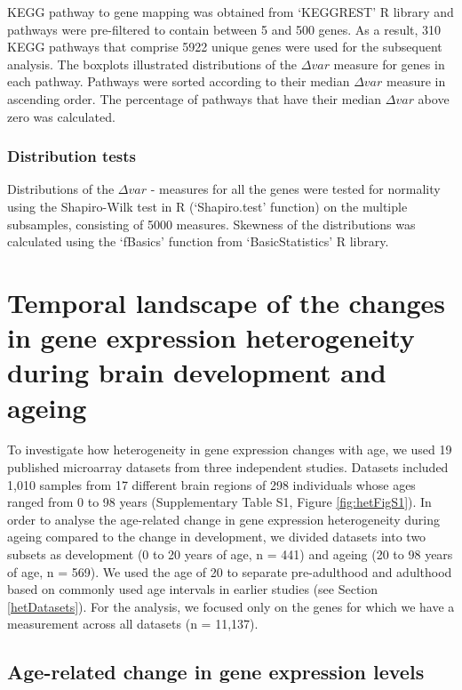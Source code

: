 \documentclass[12pt,twoside]{unicam}
\begin{document}
KEGG pathway to gene mapping was obtained from `KEGGREST' R library and pathways were pre-filtered to contain between 5 and 500 genes. As a result, 310 KEGG pathways that comprise 5922 unique genes were used for the subsequent analysis. The boxplots illustrated distributions of the \(\Delta var\) measure for genes in each pathway. Pathways were sorted according to their median \(\Delta var\) measure in ascending order. The percentage of pathways that have their median \(\Delta var\) above zero was calculated.

\hypertarget{distribution-tests}{%
\subsubsection{Distribution tests}\label{distribution-tests}}

Distributions of the \(\Delta var\) - measures for all the genes were tested for normality using the Shapiro-Wilk test in R (`Shapiro.test' function) on the multiple subsamples, consisting of 5000 measures. Skewness of the distributions was calculated using the `fBasics' function from `BasicStatistics' R library.

\hypertarget{ulasresults}{%
\section{Temporal landscape of the changes in gene expression heterogeneity during brain development and ageing}\label{ulasresults}}

To investigate how heterogeneity in gene expression changes with age, we used 19 published microarray datasets from three independent studies. Datasets included 1,010 samples from 17 different brain regions of 298 individuals whose ages ranged from 0 to 98 years (Supplementary Table S1, Figure \ref{fig:hetFigS1}). In order to analyse the age-related change in gene expression heterogeneity during ageing compared to the change in development, we divided datasets into two subsets as development (0 to 20 years of age, n = 441) and ageing (20 to 98 years of age, n = 569). We used the age of 20 to separate pre-adulthood and adulthood based on commonly used age intervals in earlier studies (see Section \ref{hetDatasets}). For the analysis, we focused only on the genes for which we have a measurement across all datasets (n = 11,137).

\hypertarget{age-related-change-in-gene-expression-levels}{%
\subsection{Age-related change in gene expression levels}\label{age-related-change-in-gene-expression-levels}}
\end{document}
